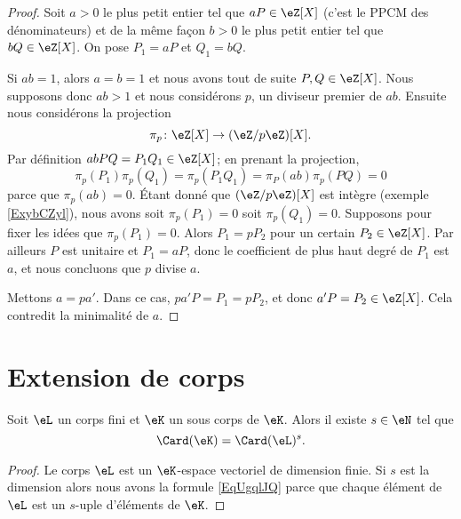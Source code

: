 \begin{proof}
    Soit \( a>0\) le plus petit entier tel que \( aP\in\eZ[X]\) (c'est le PPCM des dénominateurs) et de la même façon \( b>0\) le plus petit entier tel que \( bQ\in \eZ[X]\). On pose \( P_1=aP\) et \( Q_1=bQ\).

    Si \( ab=1\), alors \( a=b=1\) et nous avons tout de suite \( P,Q\in \eZ[X]\). Nous supposons donc \( ab>1\) et nous considérons \( p\), un diviseur premier de \( ab\). Ensuite nous considérons la projection
    \begin{equation}
        \pi_p\colon \eZ[X]\to (\eZ/p\eZ)[X].
    \end{equation}
    Par définition \( abPQ=P_1Q_1\in \eZ[X]\); en prenant la projection,
    \begin{equation}
        \pi_p(P_1)\pi_p(Q_1)=\pi_p(P_1Q_1)=\pi_P(ab)\pi_p(PQ)=0
    \end{equation}
    parce que \( \pi_p(ab)=0\). Étant donné que \( (\eZ/p\eZ)[X]\) est intègre (exemple \ref{ExybCZyl}), nous avons soit \( \pi_p(P_1)=0\) soit \( \pi_p(Q_1)=0\). Supposons pour fixer les idées que \( \pi_p(P_1)=0\). Alors \( P_1=pP_2\) pour un certain \( P_2\in \eZ[X]\). Par ailleurs \( P\) est unitaire et \( P_1=aP\), donc le coefficient de plus haut degré de \( P_1\) est \( a\), et nous concluons que \( p\) divise \( a\).
    
    Mettons \( a=pa'\). Dans ce cas, \( pa'P=P_1=pP_2\), et donc \( a'P=P_2\in \eZ[X]\). Cela contredit la minimalité de \( a\).
\end{proof}

\section{Extension de corps}
\label{SECooLQVJooTGeqiR}

\begin{lemma}       \label{LemobATFP}
    Soit \( \eL\) un corps fini et \( \eK\) un sous corps de \( \eK\). Alors il existe \( s\in \eN\) tel que
    \begin{equation}        \label{EqUgqlJQ}
        \Card(\eK)=\Card(\eL)^s.
    \end{equation}
\end{lemma}

\begin{proof}
    Le corps \( \eL\) est un \( \eK\)-espace vectoriel de dimension finie. Si \( s\) est la dimension alors nous avons la formule \eqref{EqUgqlJQ} parce que chaque élément de \( \eL\) est un \( s\)-uple d'éléments de \( \eK\).
\end{proof}

